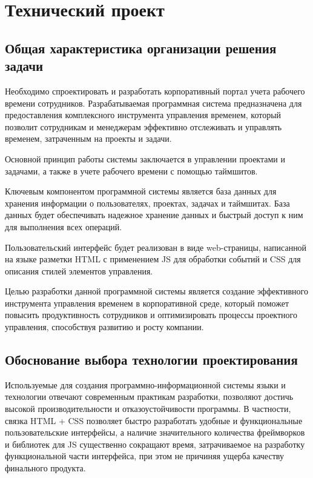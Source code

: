 \section{Технический проект}
\subsection{Общая характеристика организации решения задачи}

Необходимо спроектировать и разработать корпоративный портал учета рабочего времени сотрудников. Разрабатываемая программная система предназначена для предоставления комплексного инструмента управления временем, который позволит сотрудникам и менеджерам эффективно отслеживать и управлять временем, затраченным на проекты и задачи.

Основной принцип работы системы заключается в управлении проектами и задачами, а также в учете рабочего времени с помощью таймшитов.

Ключевым компонентом программной системы является база данных для хранения информации о пользователях, проектах, задачах и таймшитах. База данных будет обеспечивать надежное хранение данных и быстрый доступ к ним для выполнения всех операций.

Пользовательский интерфейс будет реализован в виде web-страницы, написанной на языке разметки HTML с применением JS для обработки событий и CSS для описания стилей элементов управления.

Целью разработки данной программной системы является создание эффективного инструмента управления временем в корпоративной среде, который поможет повысить продуктивность сотрудников и оптимизировать процессы проектного управления, способствуя развитию и росту компании.

\subsection{Обоснование выбора технологии проектирования}

Используемые для создания программно-информационной системы языки и технологии отвечают современным практикам разработки, позволяют достичь высокой производительности и отказоустойчивости программы. В частности, связка HTML + CSS позволяет быстро разработать удобные и функциональные пользовательские интерфейсы, а наличие значительного количества фреймворков и библиотек для JS существенно сокращают время, затрачиваемое на разработку функциональной части интерфейса, при этом не причиняя ущерба качеству финального продукта. 

